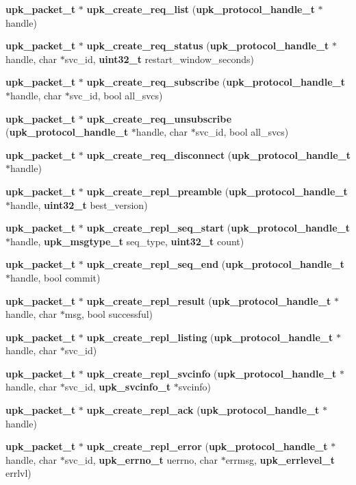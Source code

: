 \begin{DoxyCompactItemize}
{\bf upk\_\-packet\_\-t} $\ast$ {\bf upk\_\-create\_\-req\_\-list} ({\bf upk\_\-protocol\_\-handle\_\-t} $\ast$handle)
\item 
{\bf upk\_\-packet\_\-t} $\ast$ {\bf upk\_\-create\_\-req\_\-status} ({\bf upk\_\-protocol\_\-handle\_\-t} $\ast$handle, char $\ast$svc\_\-id, {\bf uint32\_\-t} restart\_\-window\_\-seconds)
\item 
{\bf upk\_\-packet\_\-t} $\ast$ {\bf upk\_\-create\_\-req\_\-subscribe} ({\bf upk\_\-protocol\_\-handle\_\-t} $\ast$handle, char $\ast$svc\_\-id, bool all\_\-svcs)
\item 
{\bf upk\_\-packet\_\-t} $\ast$ {\bf upk\_\-create\_\-req\_\-unsubscribe} ({\bf upk\_\-protocol\_\-handle\_\-t} $\ast$handle, char $\ast$svc\_\-id, bool all\_\-svcs)
\item 
{\bf upk\_\-packet\_\-t} $\ast$ {\bf upk\_\-create\_\-req\_\-disconnect} ({\bf upk\_\-protocol\_\-handle\_\-t} $\ast$handle)
\item 
{\bf upk\_\-packet\_\-t} $\ast$ {\bf upk\_\-create\_\-repl\_\-preamble} ({\bf upk\_\-protocol\_\-handle\_\-t} $\ast$handle, {\bf uint32\_\-t} best\_\-version)
\item 
{\bf upk\_\-packet\_\-t} $\ast$ {\bf upk\_\-create\_\-repl\_\-seq\_\-start} ({\bf upk\_\-protocol\_\-handle\_\-t} $\ast$handle, {\bf upk\_\-msgtype\_\-t} seq\_\-type, {\bf uint32\_\-t} count)
\item 
{\bf upk\_\-packet\_\-t} $\ast$ {\bf upk\_\-create\_\-repl\_\-seq\_\-end} ({\bf upk\_\-protocol\_\-handle\_\-t} $\ast$handle, bool commit)
\item 
{\bf upk\_\-packet\_\-t} $\ast$ {\bf upk\_\-create\_\-repl\_\-result} ({\bf upk\_\-protocol\_\-handle\_\-t} $\ast$handle, char $\ast$msg, bool successful)
\item 
{\bf upk\_\-packet\_\-t} $\ast$ {\bf upk\_\-create\_\-repl\_\-listing} ({\bf upk\_\-protocol\_\-handle\_\-t} $\ast$handle, char $\ast$svc\_\-id)
\item 
{\bf upk\_\-packet\_\-t} $\ast$ {\bf upk\_\-create\_\-repl\_\-svcinfo} ({\bf upk\_\-protocol\_\-handle\_\-t} $\ast$handle, char $\ast$svc\_\-id, {\bf upk\_\-svcinfo\_\-t} $\ast$svcinfo)
\item 
{\bf upk\_\-packet\_\-t} $\ast$ {\bf upk\_\-create\_\-repl\_\-ack} ({\bf upk\_\-protocol\_\-handle\_\-t} $\ast$handle)
\item 
{\bf upk\_\-packet\_\-t} $\ast$ {\bf upk\_\-create\_\-repl\_\-error} ({\bf upk\_\-protocol\_\-handle\_\-t} $\ast$handle, char $\ast$svc\_\-id, {\bf upk\_\-errno\_\-t} uerrno, char $\ast$errmsg, {\bf upk\_\-errlevel\_\-t} errlvl)

\end{DoxyCompactItemize}
